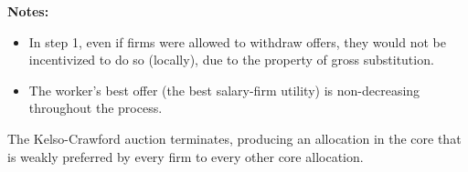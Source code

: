 \documentclass[8pt]{scrartcl}
\begin{document}
\begin{multicols*}{2}
\textbf{Notes:}
\begin{itemize}
    \item In step 1, even if firms were allowed to withdraw offers, they would not be incentivized to do so (locally), due to the property of gross substitution.
    \item The worker's best offer (the best salary-firm utility) is non-decreasing throughout the process.
\end{itemize}

    The Kelso-Crawford auction terminates, producing an allocation in the core that is weakly preferred by every firm to every other core allocation.


\end{multicols*}
\end{document}

